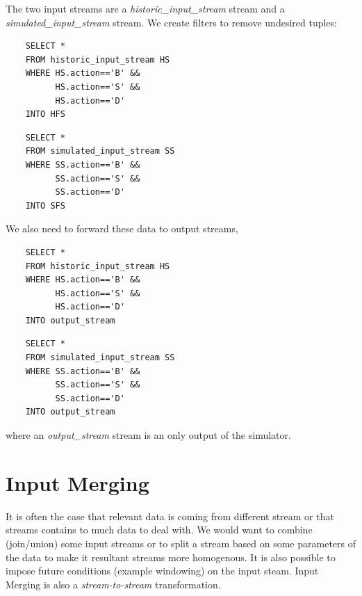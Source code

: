 \documentclass{article}
\begin{document}
The two input streams  are a \emph{historic\_input\_stream} stream and a \emph{simulated\_input\_stream} stream. We create filters to remove undesired tuples:

\begin{verbatim}   
    SELECT * 
    FROM historic_input_stream HS
    WHERE HS.action=='B' &&
          HS.action=='S' &&
          HS.action=='D'
    INTO HFS
\end{verbatim}

\begin{verbatim}  
    SELECT *
    FROM simulated_input_stream SS
    WHERE SS.action=='B' &&
          SS.action=='S' &&
          SS.action=='D'
    INTO SFS
\end{verbatim}

\noindent We also need to forward these data to output streams,

\begin{verbatim}   
    SELECT * 
    FROM historic_input_stream HS
    WHERE HS.action=='B' &&
          HS.action=='S' &&
          HS.action=='D'
    INTO output_stream
\end{verbatim}

\begin{verbatim}  
    SELECT *
    FROM simulated_input_stream SS
    WHERE SS.action=='B' &&
          SS.action=='S' &&
          SS.action=='D'
    INTO output_stream
\end{verbatim}

\noindent where an \emph{output\_stream} stream is an only output of the simulator. 


\section{Input Merging}

It is often the case that relevant data is coming from different stream or that streams contains to much data to deal with. We would want to combine (join/union) some input streams or to split a stream based on some parameters of the data to make it resultant streams more homogenous. It is also possible to impose future conditions (example windowing) on the input steam. Input Merging is also a \emph{stream-to-stream} transformation.
\\

\end{document}
